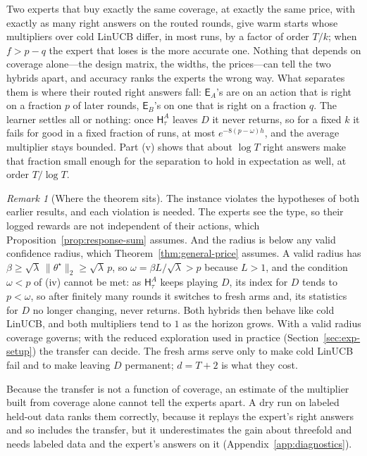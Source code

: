 \documentclass{article}
\theoremstyle{definition}
\theoremstyle{remark}
\newtheorem{remark}{Remark}
\theoremstyle{remark}
\newcommand{\Exp}{\mathsf{E}}
\newcommand{\Hyb}{\mathsf{H}}
\begin{document}
Two experts that buy exactly the same coverage, at exactly the same price,
with exactly as many right answers on the routed rounds, give warm starts
whose multipliers over cold LinUCB differ, in most runs, by a factor of order
$T/k$; when $f>p-q$ the expert that loses is the more accurate one. Nothing
that depends on coverage alone---the design matrix, the widths, the
prices---can tell the two hybrids apart, and accuracy ranks the experts the
wrong way. What separates them is where their routed right answers fall:
$\Exp_A$'s are on an action that is right on a fraction $p$ of later rounds,
$\Exp_B$'s on one that is right on a fraction $q$. The learner settles all or
nothing: once $\Hyb^A_\tau$ leaves $D$ it never returns, so for a fixed $k$ it
fails for good in a fixed fraction of runs, at most $e^{-8(p-\omega)h}$, and
the average multiplier stays bounded. Part (v) shows that about $\log T$ right
answers make that fraction small enough for the separation to hold in
expectation as well, at order $T/\log T$.

\begin{remark}[Where the theorem sits]
\label{rem:transfer-regime}
The instance violates the hypotheses of both earlier results, and each
violation is needed. The experts see the type, so their logged rewards are not
independent of their actions, which Proposition~\ref{prop:response-sum}
assumes. And the radius is below any valid confidence radius, which
Theorem~\ref{thm:general-price} assumes. A valid radius has
$\beta\ge\sqrt\lambda\,\|\theta^\star\|_2\ge\sqrt\lambda\,p$, so
$\omega=\beta L/\sqrt\lambda>p$ because $L>1$, and the condition $\omega<p$ of
(iv) cannot be met: as $\Hyb^A_\tau$ keeps playing $D$, its index for $D$
tends to $p<\omega$, so after finitely many rounds it switches to fresh arms
and, its statistics for $D$ no longer changing, never returns. Both hybrids
then behave like cold LinUCB, and both multipliers tend to $1$ as the horizon
grows. With a valid radius coverage governs; with the reduced exploration used
in practice (Section~\ref{sec:exp-setup}) the transfer can decide. The fresh
arms serve only to make cold LinUCB fail and to make leaving $D$ permanent;
$d=T+2$ is what they cost.
\end{remark}

Because the transfer is not a function of coverage, an estimate of the
multiplier built from coverage alone cannot tell the experts apart. A dry run
on labeled held-out data ranks them correctly, because it replays the expert's
right answers and so includes the transfer, but it underestimates the gain
about threefold and needs labeled data and the expert's answers on it
(Appendix~\ref{app:diagnostics}).
\end{document}
